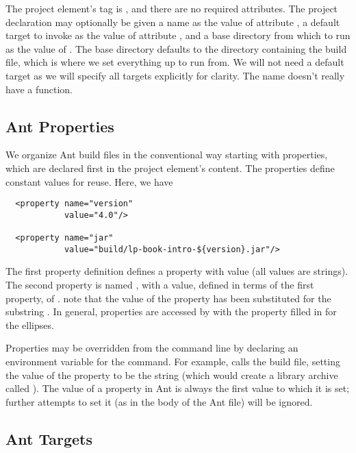 The project element's tag is , and there are no required
attributes.  The project declaration may optionally be given a name as
the value of attribute , a default target to invoke as the
value of attribute , and a base directory from which to
run as the value of .  The base directory defaults
to the directory containing the build file, which is where we set
everything up to run from.  We will not need a default target as we
will specify all targets explicitly for clarity.  The name doesn't
really have a function.

\subsection{Ant Properties}\label{section:intro-ant-properties}

We organize Ant build files in the conventional way starting with
properties, which are declared first in the project element's content.
The properties define constant values for reuse.  Here, we have
%
\begin{verbatim}
  <property name="version"
            value="4.0"/>

  <property name="jar"
            value="build/lp-book-intro-${version}.jar"/>
\end{verbatim}
%
The first property definition defines a property  with
value  (all values are strings).  The second property is
named , with a value, defined in terms of the first property,
of .  note that the value of the
property  has been substituted for the substring .
In general, properties are accessed by
 with the property filled in for the ellipses.

Properties may be overridden from the command line by declaring
an environment variable for the command.  For example,
%
%
calls the build file, setting the value of the 
property to be the string  (which would create a library
archive called ).  The value of a property in Ant is
always the first value to which it is set; further attempts to set it
(as in the body of the Ant file) will be ignored.


\subsection{Ant Targets}

